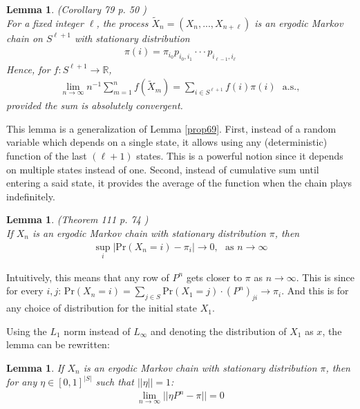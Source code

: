\documentclass{article}
\renewcommand{\Pr}[1]{\text{Pr} \left( #1 \right)}
\newcommand{\R}{\mathbb{R}}
\newtheorem{lemma}[theorem]{Lemma}
\begin{document}
\begin{lemma}\label{cor79}
    (Corollary 79 p. 50 \cite{white2001markov}) \\
    For a fixed integer $\ell$, the process $\tilde{X}_n = (X_n,...,X_{n+\ell})$ is an ergodic Markov chain on $S^{\ell + 1}$ with stationary distribution
    \begin{gather*}
        \pi(i) = \pi_{i_0} p_{i_0,i_1} \cdot \cdot \cdot p_{i_{\ell - 1}, i_\ell}
    \end{gather*}
    Hence, for $f:S^{\ell + 1} \to \R$,
    \begin{gather*}
        \lim\limits_{n \to \infty} n^{-1} \sum\limits_{m=1}^n f(\tilde{X}_m) = \sum\limits_{i \in S^{\ell + 1}} f(i) \pi(i) \ \ \ \text{a.s.},
    \end{gather*}
    provided the sum is absolutely convergent.
\end{lemma}
This lemma is a generalization of Lemma \ref{prop69}. First, instead of a random variable which depends on a single state, it allows using any (deterministic) function of the last $(\ell + 1)$ states. This is a powerful notion since it depends on multiple states instead of one.
Second, instead of cumulative sum until entering a said state, it provides the average of the function when the chain plays indefinitely.

\begin{lemma}\label{limiting_thm111_original}
    (Theorem 111 p. 74 \cite{white2001markov}) \\
    If $X_n$ is an ergodic Markov chain with stationary distribution $\pi$, then
    \begin{gather*}
        \sup_i |\Pr{X_n = i} - \pi_i| \to 0, \ \ \ \text{as } n \to \infty
    \end{gather*}
\end{lemma}
Intuitively, this means that any row of $P^n$ gets closer to $\pi$ as $n \to \infty$.
This is since for every $i, j$: $\Pr{X_n = i} = \sum\limits_{j \in S} \Pr{X_1 = j} \cdot (P^n)_{ji} \to \pi_i$. And this is for any choice of distribution for the initial state $X_1$.

Using the $L_1$ norm instead of $L_\infty$ and denoting the distribution of $X_1$ as $x$, the lemma can be rewritten:
\begin{lemma}\label{limiting_thm111}
    If $X_n$ is an ergodic Markov chain with stationary distribution $\pi$, then for any $\eta \in [0,1]^{|S|}$ such that $||\eta|| = 1$:
    \begin{gather*}
        \lim\limits_{n \to \infty} ||\eta P^n - \pi|| = 0
    \end{gather*}
\end{lemma}
\end{document}

